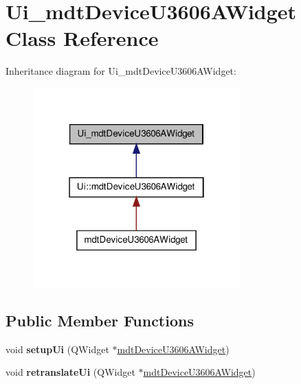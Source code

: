 \hypertarget{class_ui__mdt_device_u3606_a_widget}{
\section{Ui\_\-mdtDeviceU3606AWidget Class Reference}
\label{class_ui__mdt_device_u3606_a_widget}
}


Inheritance diagram for Ui\_\-mdtDeviceU3606AWidget:\nopagebreak
\begin{figure}[H]
\begin{center}
\leavevmode
\includegraphics[width=226pt]{class_ui__mdt_device_u3606_a_widget__inherit__graph}
\end{center}
\end{figure}
\subsection*{Public Member Functions}
\begin{DoxyCompactItemize}
\item 
\hypertarget{class_ui__mdt_device_u3606_a_widget_a2feb0a9bb350eeb5b8f79aa1caf7812e}{
void {\bfseries setupUi} (QWidget $\ast$\hyperlink{classmdt_device_u3606_a_widget}{mdtDeviceU3606AWidget})}
\label{class_ui__mdt_device_u3606_a_widget_a2feb0a9bb350eeb5b8f79aa1caf7812e}

\item 
\hypertarget{class_ui__mdt_device_u3606_a_widget_a93edfa6bf95a90961fc73dce340f20d6}{
void {\bfseries retranslateUi} (QWidget $\ast$\hyperlink{classmdt_device_u3606_a_widget}{mdtDeviceU3606AWidget})}
\label{class_ui__mdt_device_u3606_a_widget_a93edfa6bf95a90961fc73dce340f20d6}

\end{DoxyCompactItemize}
